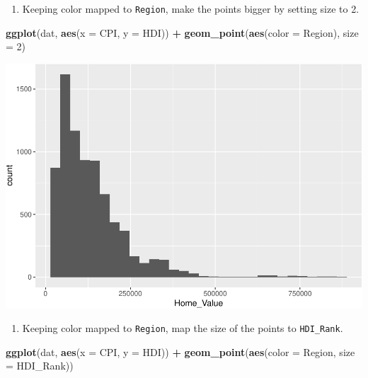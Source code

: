 \documentclass[
]{book}
\newenvironment{Shaded}{\begin{snugshade}}{\end{snugshade}}
\newcommand{\DataTypeTok}[1]{\textcolor[rgb]{0.13,0.29,0.53}{#1}}
\newcommand{\DecValTok}[1]{\textcolor[rgb]{0.00,0.00,0.81}{#1}}
\newcommand{\KeywordTok}[1]{\textcolor[rgb]{0.13,0.29,0.53}{\textbf{#1}}}
\newcommand{\NormalTok}[1]{#1}
\newcommand{\OperatorTok}[1]{\textcolor[rgb]{0.81,0.36,0.00}{\textbf{#1}}}
\newcommand{\StringTok}[1]{\textcolor[rgb]{0.31,0.60,0.02}{#1}}
\providecommand{\tightlist}{%
  \setlength{\itemsep}{0pt}\setlength{\parskip}{0pt}}
\begin{document}
\begin{alert}
\begin{enumerate}
\def\labelenumi{\arabic{enumi}.}
\setcounter{enumi}{3}
\tightlist
\item
  Keeping color mapped to \texttt{Region}, make the points bigger by setting size to 2.
\end{enumerate}

\begin{Shaded}
\begin{Highlighting}[]
\KeywordTok{ggplot}\NormalTok{(dat, }\KeywordTok{aes}\NormalTok{(}\DataTypeTok{x =}\NormalTok{ CPI, }\DataTypeTok{y =}\NormalTok{ HDI)) }\OperatorTok{+}
\StringTok{  }\KeywordTok{geom\_point}\NormalTok{(}\KeywordTok{aes}\NormalTok{(}\DataTypeTok{color =}\NormalTok{ Region), }\DataTypeTok{size =} \DecValTok{2}\NormalTok{)}
\end{Highlighting}
\end{Shaded}

\includegraphics{R/Rgraphics/figures/unnamed-chunk-163-1.pdf}

\begin{enumerate}
\def\labelenumi{\arabic{enumi}.}
\setcounter{enumi}{4}
\tightlist
\item
  Keeping color mapped to \texttt{Region}, map the size of the points to \texttt{HDI\_Rank}.
\end{enumerate}

\begin{Shaded}
\begin{Highlighting}[]
\KeywordTok{ggplot}\NormalTok{(dat, }\KeywordTok{aes}\NormalTok{(}\DataTypeTok{x =}\NormalTok{ CPI, }\DataTypeTok{y =}\NormalTok{ HDI)) }\OperatorTok{+}
\KeywordTok{geom\_point}\NormalTok{(}\KeywordTok{aes}\NormalTok{(}\DataTypeTok{color =}\NormalTok{ Region, }\DataTypeTok{size =}\NormalTok{  HDI\_Rank))}
\end{Highlighting}
\end{Shaded}


\end{alert}
\end{document}
